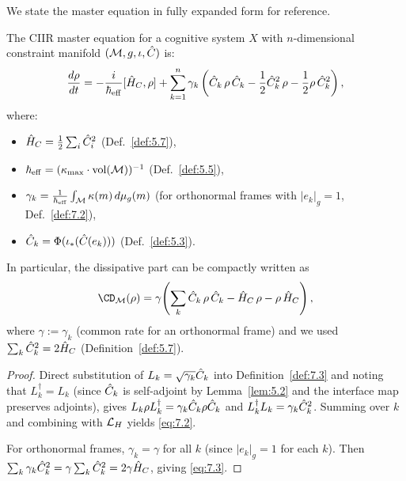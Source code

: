 We state the master equation in fully expanded form for reference.

\begin{theorem}
\label{thm:7.2}
The CIIR master equation for a cognitive system $X$ with
$n$-dimensional constraint manifold $(\mathcal{M}, g, \iota, \hat{C})$ is:
\begin{equation}\label{eq:7.2}
  \frac{d\rho}{dt}
  = -\frac{i}{\hbar_{\mathrm{eff}}}[\hat{H}_C, \rho]
  + \sum_{k=1}^{n} \gamma_k \left(
    \hat{C}_k\,\rho\,\hat{C}_k
    - \frac{1}{2}\hat{C}_k^2\,\rho
    - \frac{1}{2}\rho\,\hat{C}_k^2
  \right),
\end{equation}
where:
\begin{itemize}
  \item $\hat{H}_C = \frac{1}{2}\sum_i \hat{C}_i^2$
    \textup{(}Def.~\textup{\ref{def:5.7})},
  \item $\hbar_{\mathrm{eff}} = (\kappa_{\max} \cdot
    \mathrm{vol}(\mathcal{M}))^{-1}$
    \textup{(}Def.~\textup{\ref{def:5.5})},
  \item $\gamma_k = \frac{1}{\hbar_{\mathrm{eff}}}
    \int_{\mathcal{M}} \kappa(m)\,d\mu_g(m)$
    \textup{(}for orthonormal frames with $|e_k|_g = 1$,
    Def.~\textup{\ref{def:7.2})},
  \item $\hat{C}_k = \Phi(\iota_*(\hat{C}(e_k)))$
    \textup{(}Def.~\textup{\ref{def:5.3})}.
\end{itemize}

In particular, the dissipative part can be compactly written as
\begin{equation}\label{eq:7.3}
  \CD_\CM(\rho) = \gamma\!\left(
    \sum_k \hatC_k\,\rho\,\hatC_k - \hatH_C\,\rho
    - \rho\,\hatH_C
  \right),
\end{equation}
where $\gamma := \gamma_k$ \textup{(}common rate for an orthonormal
frame\textup{)} and we used
$\sum_k \hat{C}_k^2 = 2\hat{H}_C$ \textup{(}Definition~\textup{\ref{def:5.7})}.
\end{theorem}

\begin{proof}
Direct substitution of $L_k = \sqrt{\gamma_k}\hat{C}_k$ into
Definition~\ref{def:7.3} and noting that
$L_k^\dagger = L_k$ (since $\hat{C}_k$ is self-adjoint by
Lemma~\ref{lem:5.2} and the interface map preserves adjoints), gives
$L_k\rho L_k^\dagger = \gamma_k\hat{C}_k\rho\hat{C}_k$ and
$L_k^\dagger L_k = \gamma_k\hat{C}_k^2$.  Summing over $k$ and
combining with $\mathcal{L}_H$ yields \eqref{eq:7.2}.

For orthonormal frames, $\gamma_k = \gamma$ for all $k$ (since
$|e_k|_g = 1$ for each $k$).  Then $\sum_k \gamma_k\hat{C}_k^2 =
\gamma\sum_k\hat{C}_k^2 = 2\gamma\hat{H}_C$, giving \eqref{eq:7.3}.
\end{proof}

